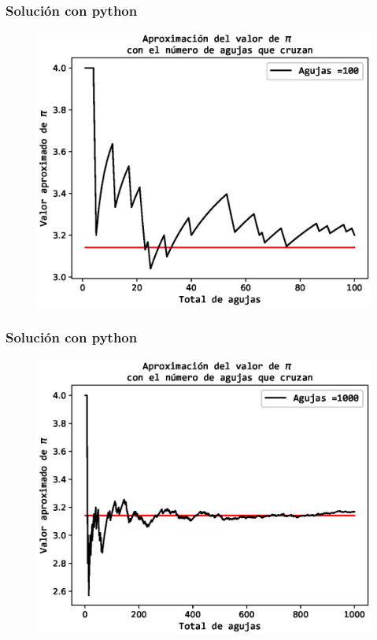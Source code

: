 \documentclass[12pt]{beamer}
\begin{document}
\begin{frame}
\frametitle{Solución con python}
\begin{figure}
  \centering
  \includegraphics[scale=0.6]{Imagenes/aproximacionPi_100.eps}
\end{figure}
\end{frame}
\begin{frame}
\frametitle{Solución con python}
\begin{figure}
  \centering
  \includegraphics[scale=0.6]{Imagenes/aproximacionPi_1000.eps}
\end{figure}
\end{frame}
\end{document}
